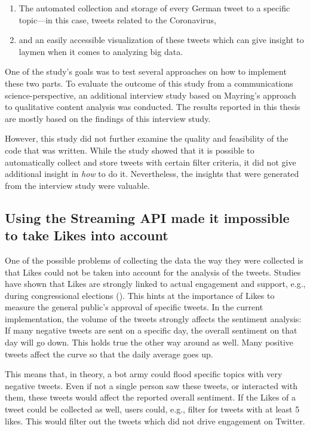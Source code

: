 \begin{enumerate}
    \item The automated collection and storage of every German tweet to a specific topic---in this case, tweets related to the Coronavirus,
    \item and an easily accessible visualization of these tweets which can give insight to laymen when it comes to analyzing big data.
\end{enumerate}

One of the study's goals was to test several approaches on how to implement these two parts. To evaluate the outcome of this study from a communications science-perspective, an additional interview study based on Mayring's approach to qualitative content analysis was conducted. The results reported in this thesis are mostly based on the findings of this interview study.

However, this study did not further examine the quality and feasibility of the code that was written. While the study showed that it is possible to automatically collect and store tweets with certain filter criteria, it did not give additional insight in \emph{how} to do it. Nevertheless, the insights that were generated from the interview study were valuable.

\subsection*{Using the Streaming API made it impossible to take Likes into account}
One of the possible problems of collecting the data the way they were collected is that Likes could not be taken into account for the analysis of the tweets. Studies have shown that Likes are strongly linked to actual engagement and support, e.g., during congressional elections (\cite{macwilliamsForecastingCongressionalElections2015}). This hints at the importance of Likes to measure the general public's approval of specific tweets. In the current implementation, the volume of the tweets strongly affects the sentiment analysis: If many negative tweets are sent on a specific day, the overall sentiment on that day will go down. This holds true the other way around as well. Many positive tweets affect the curve so that the daily average goes up.

This means that, in theory, a bot army could flood specific topics with very negative tweets. Even if not a single person saw these tweets, or interacted with them, these tweets would affect the reported overall sentiment. If the Likes of a tweet could be collected as well, users could, e.g., filter for tweets with at least 5 likes. This would filter out the tweets which did not drive engagement on Twitter.

